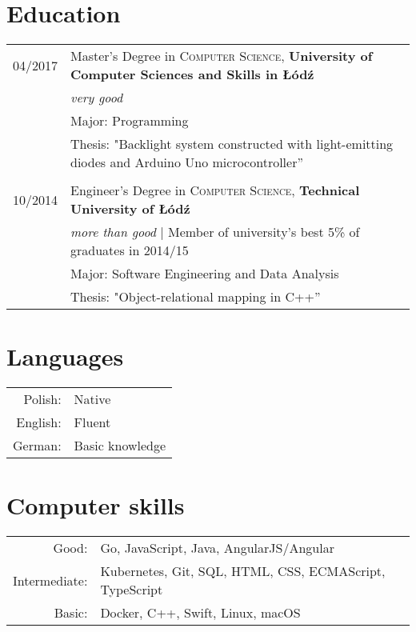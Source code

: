 \documentclass[a4paper,10pt]{article}
\begin{document}
\section{Education}

\begin{tabular}{rl}

04/2017 & Master's Degree in \textsc{Computer Science}, \textbf{University of Computer Sciences and Skills in Łódź} \\
& \small\emph{very good}\\
& \small  Major: Programming\\
& \small Thesis: "Backlight system constructed with light-emitting diodes and Arduino Uno microcontroller'' \\&\\

10/2014 & Engineer's Degree in \textsc{Computer Science}, \textbf{Technical University of Łódź} \\
& \small\emph{more than good} | Member of university’s best 5\% of graduates in 2014/15\\
& \small  Major: Software Engineering and Data Analysis \\
& \small Thesis: "Object-relational mapping in C++'' \\

\end{tabular}

\section{Languages}

\begin{tabular}{rl}
	Polish: & Native\\
	English: & Fluent\\
	German: & Basic knowledge\\
\end{tabular}

\section{Computer skills}

\begin{tabular}{rl}
  Good: & Go, JavaScript, Java, AngularJS/Angular\\
  Intermediate: & Kubernetes, Git, SQL, HTML, CSS, ECMAScript, TypeScript\\
	Basic: & Docker, C++, Swift, Linux, macOS\\
\end{tabular}
\end{document}
